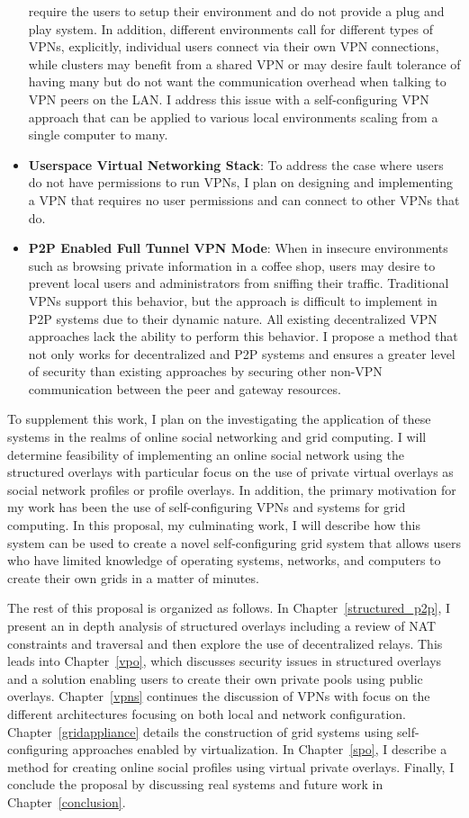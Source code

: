 \begin{itemize}
require the users to setup their environment and do not provide a plug and play
system.  In addition, different environments call for different types of VPNs,
explicitly, individual users connect via their own VPN connections, while
clusters may benefit from a shared VPN or may desire fault tolerance of having
many but do not want the communication overhead when talking to VPN peers on
the LAN.  I address this issue with a self-configuring VPN approach that can be
applied to various local environments scaling from a single computer to many.
\item \textbf{Userspace Virtual Networking Stack}: To address the case where
users do not have permissions to run VPNs, I plan on designing and implementing
a VPN that requires no user permissions and can connect to other VPNs that do.
\item \textbf{P2P Enabled Full Tunnel VPN Mode}: When in insecure environments
such as browsing private information in a coffee shop, users may desire to
prevent local users and administrators from sniffing their traffic.  Traditional
VPNs support this behavior, but the approach is difficult to implement in P2P
systems due to their dynamic nature.  All existing decentralized VPN approaches
lack the ability to perform this behavior.  I propose a method that not only
works for decentralized and P2P systems and ensures a greater level of security
than existing approaches by securing other non-VPN communication between the
peer and gateway resources.
\end{itemize}

To supplement this work, I plan on the investigating the application of these
systems in the realms of online social networking and grid computing.  I will
determine feasibility of implementing an online social network using the 
structured overlays with particular focus on the use of private virtual
overlays as social network profiles or profile overlays.  In addition, the
primary motivation for my work has been the use of self-configuring VPNs and
systems for grid computing.  In this proposal, my culminating work, I will
describe how this system can be used to create a novel self-configuring grid
system that allows users who have limited knowledge of operating systems,
networks, and computers to create their own grids in a matter of minutes.

The rest of this proposal is organized as follows.  In
Chapter~\ref{structured_p2p}, I present an in depth analysis of structured
overlays including a review of NAT constraints and traversal and then explore
the use of decentralized relays.  This leads into Chapter~\ref{vpo}, which
discusses security issues in structured overlays and a solution enabling users
to create their own private pools using public overlays.  Chapter~\ref{vpns}
continues the discussion of VPNs with focus on the different architectures 
focusing on both local and network configuration.  Chapter~\ref{gridappliance}
details the construction of grid systems using self-configuring approaches
enabled by virtualization.  In Chapter~\ref{spo}, I describe a method for
creating online social profiles using virtual private overlays.  Finally, I
conclude the proposal by  discussing real systems and future work in
Chapter~\ref{conclusion}.

